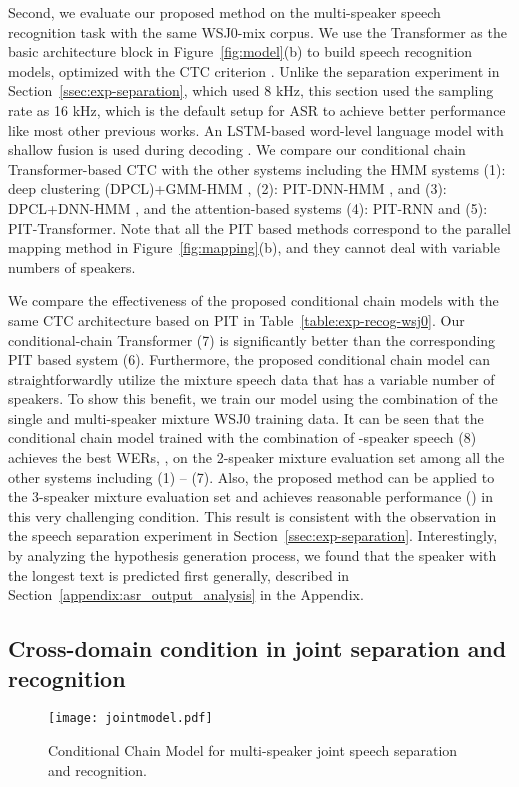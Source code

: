 \documentclass{article}
\begin{document}
Second, we evaluate our proposed method on the multi-speaker speech recognition task with the same WSJ0-mix corpus.
We use the Transformer \cite{vaswani2017attention} as the basic  architecture block in Figure~\ref{fig:model}(b) to build speech recognition models, optimized with the CTC criterion \cite{graves2006connectionist}. 
Unlike the separation experiment in Section~\ref{ssec:exp-separation}, which used 8 kHz, this section used the sampling rate as 16 kHz, which is the default setup for ASR to achieve better performance like most other previous works.
An LSTM-based word-level language model with shallow fusion is used during decoding \cite{hori2018end}.
We compare our conditional chain Transformer-based CTC  with the other systems including the HMM systems (1): deep clustering (DPCL)+GMM-HMM \cite{isik2016single}, (2): PIT-DNN-HMM \cite{qian2018single} , and (3): DPCL+DNN-HMM \cite{menne2019analysis}, and the attention-based systems (4): PIT-RNN \cite{chang2019end} and (5): PIT-Transformer.
Note that all the PIT based methods correspond to the parallel mapping method in Figure~\ref{fig:mapping}(b), and they cannot deal with variable numbers of speakers.





We compare the effectiveness of the proposed conditional chain models with the same CTC architecture based on PIT in
Table~\ref{table:exp-recog-wsj0}.
Our conditional-chain Transformer (7) is significantly better than the corresponding PIT based system (6). 
Furthermore, the proposed conditional chain model can straightforwardly utilize the mixture speech data that has a variable number of speakers. 
To show this benefit, we train our model using the combination of the single and multi-speaker mixture WSJ0 training data.
It can be seen that the conditional chain model trained with the combination of -speaker speech (8) achieves the best WERs, , on the 2-speaker mixture evaluation set among all the other systems including (1) -- (7).
Also, the proposed method can be applied to the 3-speaker mixture evaluation set and achieves reasonable performance () in this very challenging condition. 
This result is consistent with the observation in the speech separation experiment in Section~\ref{ssec:exp-separation}. 
Interestingly, by analyzing the hypothesis generation process, we found that the speaker with the longest text is predicted first generally, described in Section~\ref{appendix:asr_output_analysis} in the Appendix.


\subsection{Cross-domain condition in joint separation and recognition}
\begin{figure}[h]
  \centering
    \texttt{[image: jointmodel.pdf]}
    
    \caption{Conditional Chain Model for multi-speaker joint speech separation and recognition. \label{fig:joint}}
\end{figure}
\end{document}
